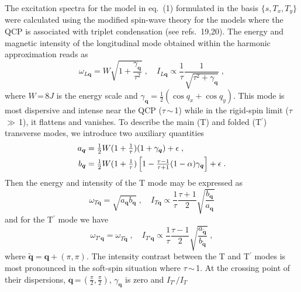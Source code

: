 \documentclass[twocolumn,prb,aps,showpacs]{revtex4-1}
\newcommand{\vc}[1]{\boldsymbol{#1}}
\begin{document}
\vspace{10 pt}




\noindent
The excitation spectra for the model in eq.~(1) formulated in the basis
$\{s,T_x,T_y\}$ were calculated using the modified spin-wave theory for
the models where the QCP is associated with triplet 
condensation (see refs.~19,20).
The energy and magnetic intensity of the longitudinal mode 
obtained within the harmonic approximation reads as
\begin{equation}
\omega_{L\vc q} = W\sqrt{1+\frac{\gamma_{\vc q}}{\tau^2}} \;,\quad
I_{L\vc q} \propto \frac{1}{\tau}\frac1{\sqrt{\tau^2+\gamma_{\vc q}}} \;,
\end{equation}
where $W$\,=\,$8J$ is the energy scale and 
$\gamma_{\vc q}=\frac12(\cos q_x+\cos q_y)$. 
This mode is most dispersive and intense
near the QCP ($\tau$\,$\sim$\,1) while in the rigid-spin limit
($\tau$\,$\gg$\,1), it 
flattens and vanishes. To describe the main (T) and folded (T$^\prime$)
transverse modes, we introduce two auxiliary quantities
\begin{align}
a_{\vc q}&=\tfrac12 W(1+\tfrac1{\tau})(1+\gamma_{\vc q})+\epsilon\;,\notag\\
b_{\vc q}&=\tfrac12 W(1+\tfrac1{\tau})\left[
1-\tfrac{\tau-1}{\tau+1}(1-\alpha)\gamma_{\vc q} \right]+\epsilon \;.
\end{align}
Then the energy and intensity of the T mode may be expressed as
\begin{equation}
\omega_{T\vc q} = \sqrt{a_{\vc q} b_{\vc q}} \;,\quad
I_{T\vc q} \propto \frac{1}{\tau} \frac{\tau+1}2 
\sqrt{\frac{b_{\vc q}}{a_{\vc q}}}
\end{equation}
and for the T$^\prime$ mode we have
\begin{equation}
\omega_{T'\vc q} = \omega_{T\vc{\tilde q}} \;,\quad
I_{T'\vc q} \propto \frac{1}{\tau} \frac{\tau-1}2 
\sqrt{\frac{a_{\vc{\tilde q}}}{b_{\vc{\tilde q}}}} \;,
\end{equation}
where $\vc{\tilde q} = \vc q + (\pi,\pi)$. 
The intensity contrast between the 
T and T$^\prime$ modes is most pronounced in the soft-spin situation
where $\tau$\,$\sim$\,1. At the crossing point of their dispersions, 
$\vc q$\,=\,$(\frac\pi2,\frac\pi2)$, $\gamma_{\vc q}$ is zero and $I_{T'}/I_T$
\end{document}
